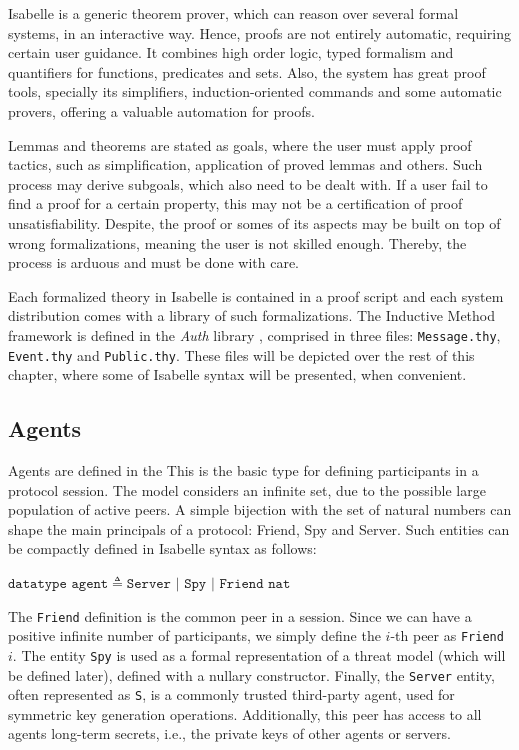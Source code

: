 Isabelle is a generic theorem prover, which can reason over several formal systems, in an interactive way. Hence, proofs are not entirely automatic, requiring certain user guidance. It combines high order logic, typed formalism and quantifiers for functions, predicates and sets. Also, the system has great proof tools, specially its simplifiers, induction-oriented commands and some automatic provers, offering a valuable automation for proofs.

Lemmas and theorems are stated as goals, where the user must apply proof tactics, such as simplification, application of proved lemmas and others. Such process may derive subgoals, which also need to be dealt with. If a user fail to find a proof for a certain property, this may not be a certification of proof unsatisfiability. Despite, the proof or somes of its aspects may be built on top of wrong formalizations, meaning the user is not skilled enough. Thereby, the process is arduous and must be done with care.

Each formalized theory in Isabelle is contained in a proof script and each system distribution comes with a library of such formalizations. The Inductive Method framework is defined in the \textit{Auth} library \cite{isabelle-hol-auth}, comprised in three files: \texttt{Message.thy}, \texttt{Event.thy} and \texttt{Public.thy}. These files will be depicted over the rest of this chapter, where some of Isabelle syntax will be presented, when convenient.



\subsection{Agents}
Agents are defined in the This is the basic type for defining participants in a protocol session. The model considers an infinite set, due to the possible large population of active peers. A simple bijection with the set of natural numbers can shape the main principals of a protocol: Friend, Spy and Server. Such entities can be compactly defined in Isabelle syntax as follows:

\begin{center}
  $\texttt{datatype agent} \triangleq \texttt{Server } | \texttt{ Spy } | \texttt{  Friend nat}$
\end{center}

The \texttt{Friend} definition is the common peer in a session. Since we can have a positive infinite number of participants, we simply define the $i$-th peer as \texttt{Friend $i$}. The entity \texttt{Spy} is used as a formal representation of a threat model (which will be defined later), defined with a nullary constructor. Finally, the \texttt{Server} entity, often represented as \texttt{S}, is a commonly trusted third-party agent, used for symmetric key generation operations. Additionally, this peer has access to all agents long-term secrets, i.e., the private keys of other agents or servers.

